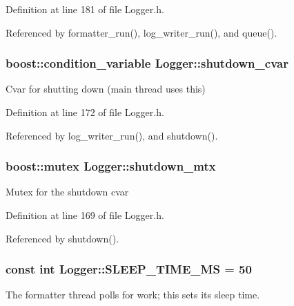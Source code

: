 Definition at line 181 of file Logger.h.



Referenced by formatter\_\-run(), log\_\-writer\_\-run(), and queue().

\hypertarget{classLogger_a62912b685f72e2782371d0867b2d23f7}{
\subsubsection[{shutdown\_\-cvar}]{\setlength{\rightskip}{0pt plus 5cm}boost::condition\_\-variable {\bf Logger::shutdown\_\-cvar}}}
\label{classLogger_a62912b685f72e2782371d0867b2d23f7}
Cvar for shutting down (main thread uses this) 

Definition at line 172 of file Logger.h.



Referenced by log\_\-writer\_\-run(), and shutdown().

\hypertarget{classLogger_a3438c31e00d8260e58269d57e2526533}{
\subsubsection[{shutdown\_\-mtx}]{\setlength{\rightskip}{0pt plus 5cm}boost::mutex {\bf Logger::shutdown\_\-mtx}}}
\label{classLogger_a3438c31e00d8260e58269d57e2526533}
Mutex for the shutdown cvar 

Definition at line 169 of file Logger.h.



Referenced by shutdown().

\hypertarget{classLogger_a7bd8d738b20738225377ac59e47792e5}{
\subsubsection[{SLEEP\_\-TIME\_\-MS}]{\setlength{\rightskip}{0pt plus 5cm}const int {\bf Logger::SLEEP\_\-TIME\_\-MS} = 50}}
\label{classLogger_a7bd8d738b20738225377ac59e47792e5}
The formatter thread polls for work; this sets its sleep time. 


